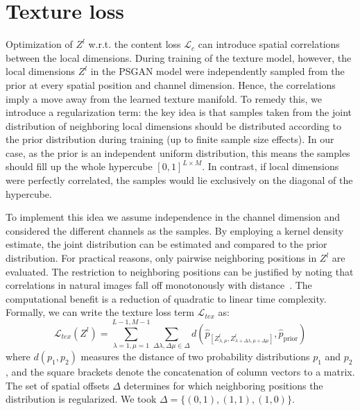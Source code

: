 \documentclass{article}
\begin{document}
\section{Texture loss}%
\label{sec_locreg}

Optimization of $Z^l$ w.r.t. the content loss $\mathcal{L}_c$ can introduce spatial correlations between the local dimensions. During training of the texture model, however, the local dimensions $Z^l$ in the PSGAN model were independently sampled from the prior at every spatial position and channel dimension. Hence, the correlations imply a move away from the learned texture manifold. To remedy this, we introduce a regularization term: the key idea is that samples taken from the joint distribution of neighboring local dimensions should be distributed according to the prior distribution during training (up to finite sample size effects). In our case, as the prior is an independent uniform distribution, this means the samples should fill up the whole hypercube $[0,1]^{L \times M}$. In contrast, if local dimensions were perfectly correlated, the samples would lie exclusively on the diagonal of the hypercube.

To implement this idea we assume independence in the channel dimension and considered the different channels as the samples. By employing a kernel density estimate, the joint distribution can be estimated and compared to the prior distribution. For practical reasons, only pairwise neighboring positions in $Z^l$ are evaluated. The restriction to neighboring positions can be justified by noting that correlations in natural images fall off monotonously with distance~\cite{hyvarinen2009natural}. The computational benefit is a reduction of quadratic to linear time complexity. 
Formally, we can write the texture loss term $\mathcal{L}_{tex}$ as:
\begin{equation}
\mathcal{L}_{tex}(Z^l) = \sum_{\lambda=1,\mu=1}^{L-1,M-1} 
\sum_{\Delta\lambda,\Delta\mu \in \Delta} d\left( \hat p_{\left[ Z^l_{\lambda,\mu},Z^l_{\lambda+\Delta\lambda,\mu + \Delta\mu} \right]}, \hat p_{\mathrm{prior}}\right)
\end{equation}
where $d(p_1, p_2)$ measures the distance of two probability distributions $p_1$ and $p_2$, and the square brackets denote the concatenation of column vectors to a matrix. The set of spatial offsets $\Delta$ determines for which neighboring positions the distribution is regularized. We took $\Delta = \{(0,1),(1,1),(1,0)\}$.
\end{document}
